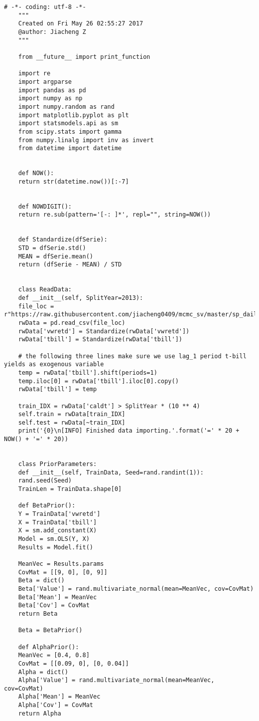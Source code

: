 \documentclass[letterpaper]{article}
\begin{document}
	\PythonStyle
	\begin{lstlisting}[label=lst:pythoncode]
	# -*- coding: utf-8 -*-
	"""
	Created on Fri May 26 02:55:27 2017
	@author: Jiacheng Z
	"""
	
	from __future__ import print_function
	
	import re
	import argparse
	import pandas as pd
	import numpy as np
	import numpy.random as rand
	import matplotlib.pyplot as plt
	import statsmodels.api as sm
	from scipy.stats import gamma
	from numpy.linalg import inv as invert
	from datetime import datetime
	
	
	def NOW():
	return str(datetime.now())[:-7]
	
	
	def NOWDIGIT():
	return re.sub(pattern='[-: ]*', repl="", string=NOW())
	
	
	def Standardize(dfSerie):
	STD = dfSerie.std()
	MEAN = dfSerie.mean()
	return (dfSerie - MEAN) / STD
	
	
	class ReadData:
	def __init__(self, SplitYear=2013):
	file_loc = r"https://raw.githubusercontent.com/jiacheng0409/mcmc_sv/master/sp_daily.csv"
	rwData = pd.read_csv(file_loc)
	rwData['vwretd'] = Standardize(rwData['vwretd'])
	rwData['tbill'] = Standardize(rwData['tbill'])
	
	# the following three lines make sure we use lag_1 period t-bill yields as exogenous variable
	temp = rwData['tbill'].shift(periods=1)
	temp.iloc[0] = rwData['tbill'].iloc[0].copy()
	rwData['tbill'] = temp
	
	train_IDX = rwData['caldt'] > SplitYear * (10 ** 4)
	self.train = rwData[train_IDX]
	self.test = rwData[~train_IDX]
	print('{0}\n[INFO] Finished data importing.'.format('=' * 20 + NOW() + '=' * 20))
	
	
	class PriorParameters:
	def __init__(self, TrainData, Seed=rand.randint(1)):
	rand.seed(Seed)
	TrainLen = TrainData.shape[0]
	
	def BetaPrior():
	Y = TrainData['vwretd']
	X = TrainData['tbill']
	X = sm.add_constant(X)
	Model = sm.OLS(Y, X)
	Results = Model.fit()
	
	MeanVec = Results.params
	CovMat = [[9, 0], [0, 9]]
	Beta = dict()
	Beta['Value'] = rand.multivariate_normal(mean=MeanVec, cov=CovMat)
	Beta['Mean'] = MeanVec
	Beta['Cov'] = CovMat
	return Beta
	
	Beta = BetaPrior()
	
	def AlphaPrior():
	MeanVec = [0.4, 0.8]
	CovMat = [[0.09, 0], [0, 0.04]]
	Alpha = dict()
	Alpha['Value'] = rand.multivariate_normal(mean=MeanVec, cov=CovMat)
	Alpha['Mean'] = MeanVec
	Alpha['Cov'] = CovMat
	return Alpha
	

\end{lstlisting}
\end{document}

